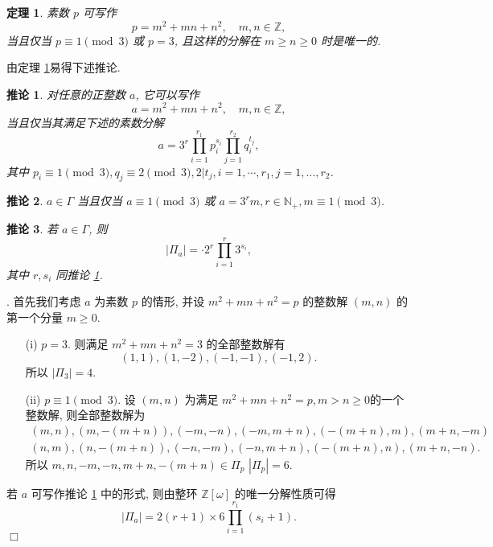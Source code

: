 \documentclass[master]{cugthesis}
\newcommand\N{\ensuremath{\mathbb{N}}}
\newcommand\Z{\ensuremath{\mathbb{Z}}}
\newtheorem{theorem}{定理}[chapter]
\newenvironment{proof}{{\noindent\itshape 证明}.}{\hfill $\Box$\par}
\newtheorem{corollary}{推论}[chapter]
\begin{document}
  \begin{theorem}\label{thm-prime}
 素数 $p$ 可写作
 \begin{equation*}
     p=m^2+mn+n^2,\quad m,n\in\Z,
 \end{equation*}
 当且仅当 $p\equiv 1\pmod{3}$ 或 $p=3$, 且这样的分解在 $m\ge n\ge 0$ 时是唯一的.
 \end{theorem}
 
 由定理 \ref{thm-prime}易得下述推论.
 \begin{corollary}\label{crc-1}
 对任意的正整数 $a$, 它可以写作
 \begin{equation*}
     a=m^2+mn+n^2,\quad m,n\in\Z,
 \end{equation*}
  当且仅当其满足下述的素数分解
 \begin{equation}\label{prime-decomp}
     a=3^r\prod_{i=1}^{r_1}p_i^{s_i}\prod_{j=1}^{r_2}q_i^{t_j},
 \end{equation}
 其中 $p_i\equiv 1\pmod{3}, q_j\equiv 2\pmod{3}, 2|t_j,i=1,\cdots,r_1,j=1,\dots,r_2$.
 \end{corollary}

 \begin{corollary}
 $a\in\Gamma$ 当且仅当 $a\equiv 1\pmod{3}$ 或 $a=3^rm,r\in \N_{+},m\equiv 1 \pmod{3}$.
 \end{corollary}
 \begin{corollary}
 若 $a\in \Gamma$, 则
 \begin{equation}
     |\Pi_a|=\cdot 2^r\prod_{i=1}^r3^{s_i},
 \end{equation}
 其中 $r,s_i$ 同推论 \ref{crc-1}.
 \end{corollary}
 \begin{proof}
 首先我们考虑 $a$ 为素数 $p$ 的情形, 并设 $m^2+mn+n^2=p$ 的整数解 $(m,n)$ 的第一个分量 $m\ge 0$.
 \begin{enumerate}
     \item [(i)] $p=3$. 则满足 $m^2+mn+n^2=3$ 的全部整数解有
     \begin{equation*}
         (1,1),(1,-2),(-1,-1),(-1,2).
     \end{equation*}
     所以 $|\Pi_3|=4$.
     \item [(ii)] $p\equiv 1\pmod{3}$. 设 $(m,n)$ 为满足 $m^2+mn+n^2=p,m> n\ge 0$的一个整数解, 则全部整数解为
     \begin{equation*}
         \begin{array}{cc}
           (m,n),(m,-(m+n)),(-m,-n),(-m,m+n),(-(m+n),m),(m+n,-m)   &  \\
            (n,m),(n,-(m+n)),(-n,-m),(-n,m+n),(-(m+n),n),(m+n,-n).  & 
         \end{array}
     \end{equation*}
     所以 $m,n,-m,-n,m+n,-(m+n)\in \Pi_p$ $|\Pi_p|=6$.
 \end{enumerate}
 若 $a$ 可写作推论 \ref{crc-1} 中的形式, 则由整环 $\Z [\omega]$ 的唯一分解性质可得
 $$|\Pi_a|=2(r+1)\times 6\prod_{i=1}^{r_1}\left(s_i+1\right).$$
 \end{proof}
\end{document}
